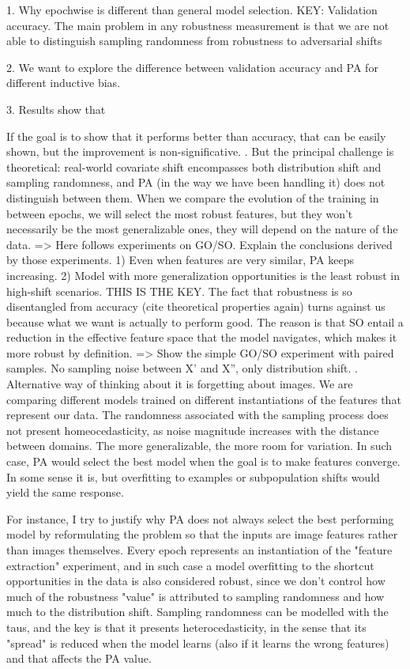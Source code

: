 1. Why epochwise is different than general model selection. KEY: Validation accuracy. The
main problem in any robustness measurement is that we are not able to distinguish sampling
randomness from robustness to adversarial shifts


2. We want to explore the difference between validation accuracy and PA for different inductive
bias.



3. Results show that


If the goal is to show that it performs better than accuracy, that can be easily shown, but the improvement is non-significative.
. But the principal challenge is theoretical: real-world covariate shift encompasses both distribution shift and sampling randomness, and PA (in the way we have been handling it) does not distinguish between them. When we compare the evolution of the training in between epochs, we will select the most robust features, but they won't necessarily be the most generalizable ones, they will depend on the nature of the data.
=> Here follows experiments on GO/SO. Explain the conclusions derived by those experiments.
    1) Even when features are very similar, PA keeps increasing.
    2) Model with more generalization opportunities is the least robust in high-shift scenarios. THIS IS THE KEY. The fact that robustness is so disentangled from accuracy (cite theoretical properties again) turns against us because what we want is actually to perform good. The reason is that SO entail a reduction in the effective feature space that the model navigates, which makes it more robust by definition.
=> Show the simple GO/SO experiment with paired samples. No sampling noise between X' and X'', only distribution shift.
. Alternative way of thinking about it is forgetting about images. We are comparing different models
 trained on different instantiations of the features that represent our data. The randomness 
 associated with the sampling process does not present homeocedasticity, as noise magnitude 
 increases with the distance between domains. The more generalizable, the more room for variation. 
 In such case, PA would select the best model when the goal is to make features converge. In some 
 sense it is, but overfitting to examples or subpopulation shifts would yield the same response.

 For instance, I try to justify why PA does not always select the best performing model by reformulating the problem so that the inputs are image features rather than images themselves. Every epoch represents an instantiation of the "feature extraction" experiment, and in such case a model overfitting to the shortcut opportunities in the data is also considered robust, since we don't control how much of the robustness "value" is attributed to sampling randomness and how much to the distribution shift. Sampling randomness can be modelled with the taus, and the key is that it presents heterocedasticity, in the sense that its "spread" is reduced when the model learns (also if it learns the wrong features) and that affects the PA value.

